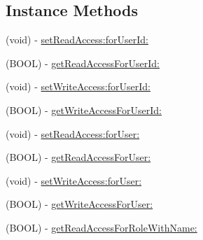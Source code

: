 \subsection*{Instance Methods}
\begin{DoxyCompactItemize}
\item 
(void) -\/ \hyperlink{interface_p_f_a_c_l_ab07fc67985c4192d98687ee4506c3f7d}{set\+Read\+Access\+:for\+User\+Id\+:}
\begin{DoxyCompactList}\small\item\em 

 \end{DoxyCompactList}\item 
(B\+O\+O\+L) -\/ \hyperlink{interface_p_f_a_c_l_ab6007a4ff90412ba96d2cb747ac00608}{get\+Read\+Access\+For\+User\+Id\+:}
\item 
(void) -\/ \hyperlink{interface_p_f_a_c_l_a220cde1f59e7686b437e49a48098b7af}{set\+Write\+Access\+:for\+User\+Id\+:}
\item 
(B\+O\+O\+L) -\/ \hyperlink{interface_p_f_a_c_l_aa7531e1a18602d291c3be1185d4d32df}{get\+Write\+Access\+For\+User\+Id\+:}
\item 
(void) -\/ \hyperlink{interface_p_f_a_c_l_a922fd610d717721028053de889bf2206}{set\+Read\+Access\+:for\+User\+:}
\item 
(B\+O\+O\+L) -\/ \hyperlink{interface_p_f_a_c_l_a899d76874d7995405bb4a7144dbb3217}{get\+Read\+Access\+For\+User\+:}
\item 
(void) -\/ \hyperlink{interface_p_f_a_c_l_a0e7e1dfd5eef9031fed403f897dfc450}{set\+Write\+Access\+:for\+User\+:}
\item 
(B\+O\+O\+L) -\/ \hyperlink{interface_p_f_a_c_l_ab34333f902c3da04f5937d3ca84838a0}{get\+Write\+Access\+For\+User\+:}
\item 
(B\+O\+O\+L) -\/ \hyperlink{interface_p_f_a_c_l_a3d4c61fb9509294e55b1594d524b2ea0}{get\+Read\+Access\+For\+Role\+With\+Name\+:}
\begin{DoxyCompactList}\small\item\em 


\end{DoxyCompactList}
\end{DoxyCompactItemize}
